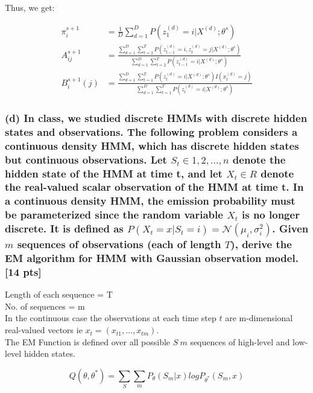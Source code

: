 \documentclass[twoside,11pt]{article}\usepackage{amsmath,amsfonts,amsthm,fullpage}
\begin{document}
Thus, we get:

\begin{equation} \nonumber
\begin{split}
\pi_i^{s+1} &= \frac{1}{D} \sum^D_{d=1} P(z_1^{(d)} = i | X^{(d)} ; \theta^s) \\
A_{ij}^{s+1} &= \frac{\sum^D_{d=1} \sum^T_{t=2} P({z_{t-1}^{(d)}} = i,  {z_{t}^{(d)}} = j | X^{(d)} ; \theta^s)}{ \sum^D_{d=1} \sum^T_{t=2} P({z_{t-1}^{(d)}} = i | X^{(d)} ; \theta^s)} \\
B_{i}^{s+1}(j) &= \frac{\sum^D_{d=1} \sum^T_{t=1} P({z_{t}^{(d)}} = i | X^{(d)} ; \theta^s) I(x_t^{(d)} = j)}{ \sum^D_{d=1} \sum^T_{t=1} P({z_{t}^{(d)}} = i | X^{(d)} ; \theta^s)}
\end{split}
\end{equation}

\subsubsection*{(d) In class, we studied discrete HMMs with discrete hidden states and
observations. The following problem considers a continuous density
HMM, which has discrete hidden states but continuous observations.
Let $S_t \in {1, 2, ..., n}$ denote the hidden state of the HMM at
time t, and let $X_t \in R$ denote the real-valued scalar
observation of the HMM at time t. In a continuous density HMM, the
emission probability must be parameterized since the random variable
$X_t$ is no longer discrete. It is defined as $P(X_t = x|S_t = i) =
\mathcal{N}(\mu_i,\sigma_i^2)$. Given $m$ sequences of observations
(each of length $T$), derive the EM algorithm for HMM with Gaussian
observation model. [14 pts]}


Length of each sequence = T \\
No. of sequences = m \\

In the continuous case the observations at each time step $t$ are m-dimensional real-valued vectors ie $x_t = ( x_{t1}, \ldots , x_{tm} )$. \\

The EM Function is defined over all possible $S\ m$ sequences of high-level and low-level hidden states.

$$ Q(\theta, \theta^*) = \underset{S}{\sum} \underset{m}{\sum} P_\theta (S_m | x) log P_{\theta^*} (S_m,x)$$
\end{document}
